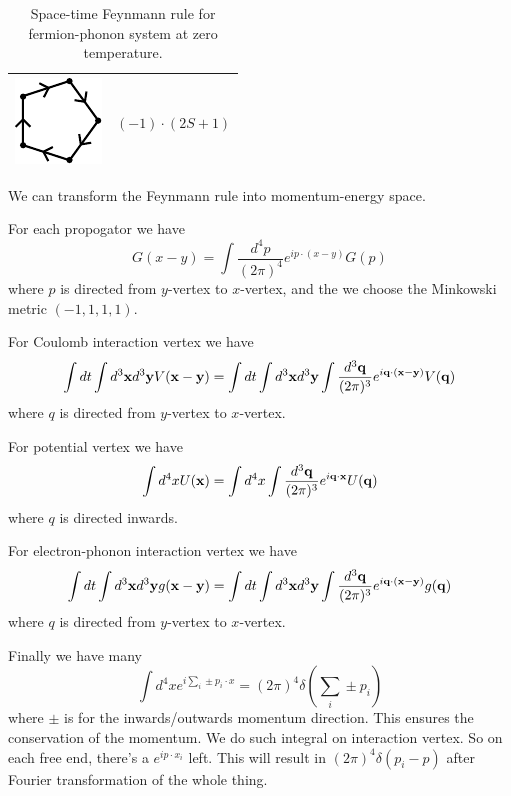 \documentclass[12pt]{book}
\begin{document}
\begin{table}[htp!]
\begin{tabular}{| >{\centering\arraybackslash}m{15em}|>{\centering\arraybackslash} m{12em}|}
		\hline
		\vspace{2.5ex}\includegraphics[scale=1]{resources/chap_feyn_diag/fdiag_frule6.pdf}\vspace{1ex}&$(-1)\cdot(2S+1)$\vspace{0.5ex}\\
		\hline
		\end{tabular}
		\caption{Space-time Feynmann rule for fermion-phonon system at zero temperature.}
		\label{tab:space_frule}
	\end{table}
	
	We can transform the Feynmann rule into momentum-energy space.
	
	For each propogator we have
	\begin{equation}
		G(x-y)=\int\frac {d^4p}{(2\pi)^4}e^{ip\cdot(x-y)}G(p)
	\end{equation}
	where $p$ is directed from $y$-vertex to $x$-vertex, and the we choose the Minkowski metric $(-1,1,1,1)$.
	
	For Coulomb interaction vertex we have
	\begin{equation}
		\int dt\int d^3{\bf x}d^3{\bf y}V({\bf x}-{\bf y})=\int dt\int d^3{\bf x}d^3{\bf y}\int\frac{d^3{\bf q}}{(2\pi)^3}e^{i{\bf q}\cdot({\bf x}-{\bf y})}V({\bf q})
	\end{equation}
	where $q$ is directed from $y$-vertex to $x$-vertex.
	
	For  potential vertex we have
	\begin{equation}
		\int d^4xU({\bf x})=\int d^4x\int\frac{d^3{\bf q}}{(2\pi)^3}e^{i{\bf q}\cdot {\bf x}}U({\bf q})
	\end{equation}
	where $q$ is directed inwards.
	
	For electron-phonon interaction vertex we have
	\begin{equation}
		\int dt\int d^3{\bf x}d^3{\bf y}g({\bf x}-{\bf y})=\int dt\int d^3{\bf x}d^3{\bf y}\int\frac{d^3{\bf q}}{(2\pi)^3}e^{i{\bf q}\cdot({\bf x}-{\bf y})}g({\bf q})
	\end{equation}
	where $q$ is directed from $y$-vertex to $x$-vertex.
	
	Finally we have many
	\begin{equation}
		\int d^4xe^{i\sum_i\pm p_i\cdot x}=(2\pi)^4\delta(\sum_i\pm p_i)
	\end{equation}
	where $\pm$ is for the inwards/outwards momentum direction. This ensures the conservation of the momentum. We do such integral on interaction vertex. So on each free end, there's a $e^{ip\cdot x_i}$ left. This will result in $(2\pi)^4\delta(p_i-p)$ after Fourier transformation of the whole thing.
	
\end{document}
